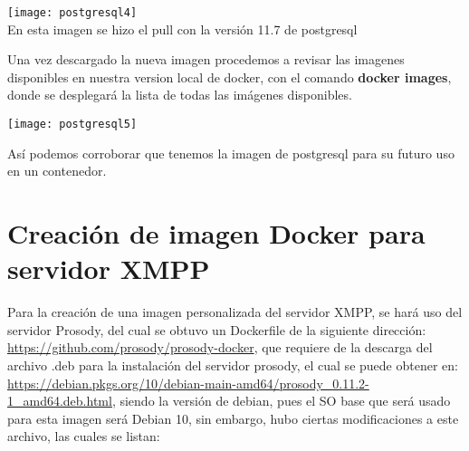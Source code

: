\documentclass[10pt,letterpaper]{article}
\begin{document}
\begin{center}
\texttt{[image: postgresql4]}\\
En esta imagen se hizo el pull con la versión 11.7 de postgresql
\end{center}

Una vez descargado la nueva imagen procedemos a revisar las imagenes disponibles en nuestra version local de docker, con el comando \textbf{docker images}, donde se desplegará la lista de todas las imágenes disponibles.

\begin{center}
\texttt{[image: postgresql5]}
\end{center}

Así podemos corroborar que tenemos la imagen de postgresql para su futuro uso en un contenedor.

\section{Creación de imagen Docker para servidor XMPP}

Para la creación de una imagen personalizada del servidor XMPP, se hará uso del servidor Prosody, del cual se obtuvo un Dockerfile de la siguiente dirección: \url{https://github.com/prosody/prosody-docker}, que requiere de la descarga del archivo .deb para la instalación del servidor prosody, el cual se puede obtener en: \url{https://debian.pkgs.org/10/debian-main-amd64/prosody_0.11.2-1_amd64.deb.html}, siendo la versión de debian, pues el SO base que será usado para esta imagen será Debian 10, sin embargo, hubo ciertas modificaciones a este archivo, las cuales se listan:
\end{document}
